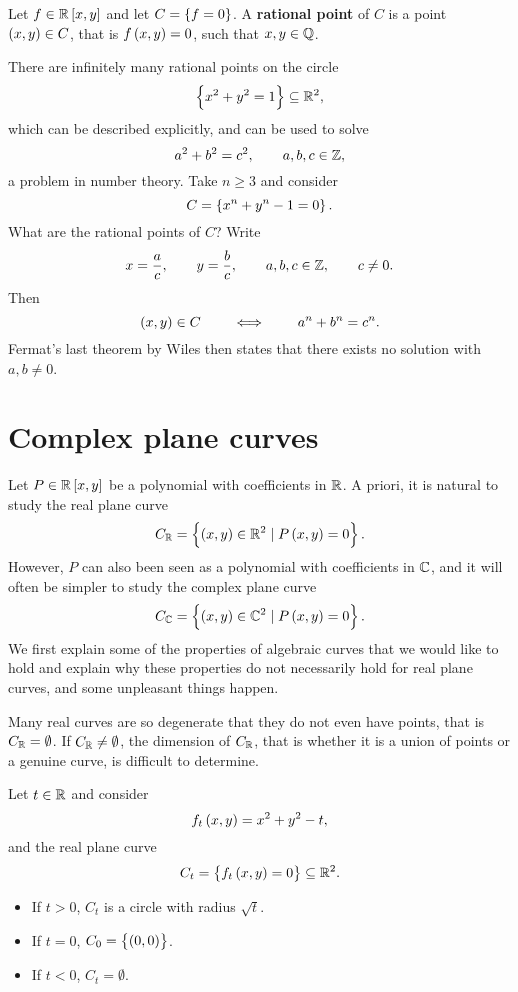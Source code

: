 
\begin{definition}
Let $ f \in \R\sbr{x, y} $ and let $ C = \cbr{f = 0} $. A \textbf{rational point} of $ C $ is a point $ \br{x, y} \in C $, that is $ f\br{x, y} = 0 $, such that $ x, y \in \mathbb{Q} $.
\end{definition}

\begin{example}
There are infinitely many rational points on the circle
$$ \cbr{x^2 + y^2 = 1} \subseteq \R^2, $$
which can be described explicitly, and can be used to solve
$$ a^2 + b^2 = c^2, \qquad a, b, c \in \mathbb{Z}, $$
a problem in number theory. Take $ n \ge 3 $ and consider
$$ C = \cbr{x^n + y^n - 1 = 0}. $$
What are the rational points of $ C $? Write
$$ x = \dfrac{a}{c}, \qquad y = \dfrac{b}{c}, \qquad a, b, c \in \mathbb{Z}, \qquad c \ne 0. $$
Then
$$ \br{x, y} \in C \qquad \iff \qquad a^n + b^n = c^n. $$
Fermat's last theorem by Wiles then states that there exists no solution with $ a, b \ne 0 $.
\end{example}

\pagebreak

\section{Complex plane curves}

Let $ P \in \R\sbr{x, y} $ be a polynomial with coefficients in $ \mathbb{R} $. A priori, it is natural to study the real plane curve
$$ C_\R = \cbr{\br{x, y} \in \R^2 \mid P\br{x, y} = 0}. $$
However, $ P $ can also been seen as a polynomial with coefficients in $ \mathbb{C} $, and it will often be simpler to study the complex plane curve
$$ C_\C = \cbr{\br{x, y} \in \C^2 \mid P\br{x, y} = 0}. $$
We first explain some of the properties of algebraic curves that we would like to hold and explain why these properties do not necessarily hold for real plane curves, and some unpleasant things happen.

\begin{fact*}
Many real curves are so degenerate that they do not even have points, that is $ C_{\mathbb{R}} = \emptyset $. If $ C_{\mathbb{R}} \ne \emptyset $, the dimension of $ C_{\mathbb{R}} $, that is whether it is a union of points or a genuine curve, is difficult to determine.
\end{fact*}

\begin{example}
\label{eg:2.1}
Let $ t \in \mathbb{R} $ and consider
$$ f_t\br{x, y} = x^2 + y^2 - t, $$
and the real plane curve
$$ C_t = \cbr{f_t\br{x, y} = 0} \subseteq \R^2. $$
\begin{itemize}
\item If $ t > 0 $, $ C_t $ is a circle with radius $ \sqrt{t} $.
\item If $ t = 0 $, $ C_0 = \cbr{\br{0, 0}} $.
\item If $ t < 0 $, $ C_t = \emptyset $.
\end{itemize}

\end{example}

